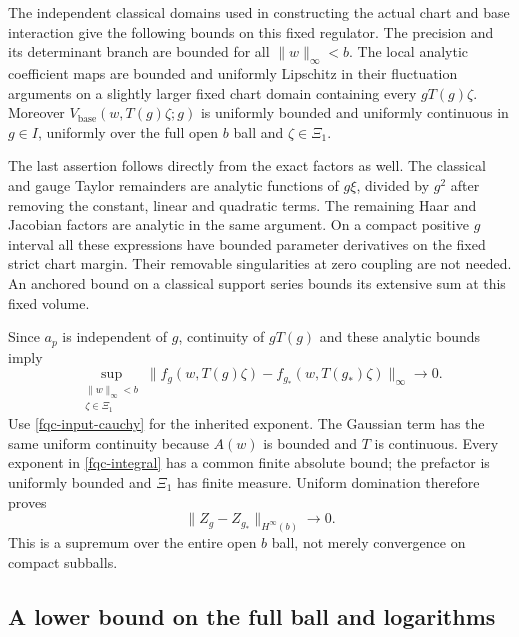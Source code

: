 \documentclass[11pt]{article}
\theoremstyle{remark}
\begin{document}
The independent classical domains used in constructing the actual
chart and base interaction give the following bounds on this
fixed regulator. The precision and its determinant branch are
bounded for all $\lVert w\rVert_\infty<b$. The local analytic
coefficient maps are bounded and uniformly Lipschitz in their
fluctuation arguments on a slightly larger fixed chart domain
containing every $gT(g)\zeta$. Moreover
$V_{\mathrm{base}}(w,T(g)\zeta;g)$ is uniformly bounded and
uniformly continuous in $g\in I$, uniformly over the full open
$b$ ball and $\zeta\in\Xi_1$.

The last assertion follows directly from the exact factors as
well. The classical and gauge Taylor remainders are analytic
functions of $g\xi$, divided by $g^2$ after removing the constant,
linear and quadratic terms. The remaining Haar and Jacobian
factors are analytic in the same argument. On a compact positive
$g$ interval all these expressions have bounded parameter
derivatives on the fixed strict chart margin. Their removable
singularities at zero coupling are not needed. An anchored bound
on a classical support series bounds its extensive sum at this
fixed volume.

Since $a_p$ is independent of $g$, continuity of $gT(g)$ and these
analytic bounds imply
\begin{equation}
 \sup_{\substack{\lVert w\rVert_\infty<b\\\zeta\in\Xi_1}}
 \bigl\lVert f_g(w,T(g)\zeta)
       -f_{g_*}(w,T(g_*)\zeta)\bigr\rVert_\infty
       \longrightarrow0.
 \label{fqc-field-continuity}
\end{equation}
Use \eqref{fqc-input-cauchy} for the inherited exponent. The
Gaussian term has the same uniform continuity because $A(w)$
is bounded and $T$ is continuous. Every exponent in
\eqref{fqc-integral} has a common finite absolute bound; the
prefactor is uniformly bounded and $\Xi_1$ has finite measure.
Uniform domination therefore proves
\begin{equation}
 \lVert Z_g-Z_{g_*}\rVert_{H^\infty(b)}
       \longrightarrow0 .
 \label{fqc-z-continuity}
\end{equation}
This is a supremum over the entire open $b$ ball, not merely
convergence on compact subballs.

\subsection{A lower bound on the full ball and logarithms}
\label{fqc-log-section}
\end{document}

